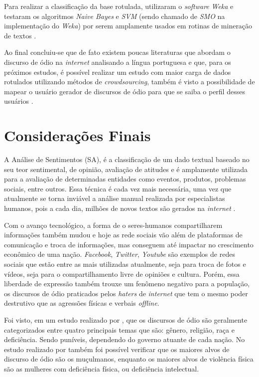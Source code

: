 Para realizar a classificação da base rotulada,  utilizaram o \textit{software} \textit{Weka} e testaram os algoritmos \textit{Naive Bayes} e \textit{SVM} (sendo chamado de \textit{SMO} na implementação do \textit{Weka}) por serem amplamente usados em rotinas de mineração de textos \cite{Pelle2017}. 

Ao final concluiu-se que de fato existem poucas literaturas que abordam o discurso de ódio na \textit{internet} analisando a língua portuguesa e que, para os próximos estudos, é possível realizar um estudo com maior carga de dados rotulados utilizando métodos de \textit{crowdsourcing}, também é visto a possibilidade de mapear o usuário gerador de discursos de ódio para que se saiba o perfil desses usuários \cite{Pelle2017}.

\section{Considerações Finais}
A Análise de Sentimentos (SA), é a classificação de um dado textual baseado no seu teor sentimental, de opinião, avaliação de atitudes e é amplamente utilizada para a avaliação de determinadas entidades como eventos, produtos, problemas sociais, entre outros. Essa técnica é cada vez mais necessária, uma vez que atualmente se torna inviável a análise manual realizada por especialistas humanos, pois a cada dia, milhões de novos textos são gerados na \textit{internet} \cite{BAHRI2018669}.

Com o avanço tecnológico, a forma de o seres-humanos compartilharem informações também mudou e hoje as rede sociais vão além de plataformas de comunicação e troca de informações, mas conseguem até impactar no crescimento econômico de uma nação. \textit{Facebook}, \textit{Twitter}, \textit{Youtube} são exemplos de redes sociais que estão entre as mais utilizadas atualmente, seja para troca de fotos e vídeos, seja para o compartilhamento livre de opiniões e cultura. Porém, essa liberdade de expressão também trouxe um fenômeno negativo para a população, os discursos de ódio praticados pelos \textit{haters} de \textit{internet} que tem o mesmo poder destrutivo que as agressões físicas e verbais \textit{offline}. 

Foi visto, em um estudo realizado por , que os discursos de ódio são geralmente categorizados entre quatro principais temas que são: gênero, religião, raça e deficiência. Sendo puníveis, dependendo do governo atuante de cada nação. No estudo realizado por  também foi possível verificar que os maiores alvos de discurso de ódio são os muçulmanos, enquanto os maiores alvos de violência física são as mulheres com deficiência física, ou deficiência intelectual.


